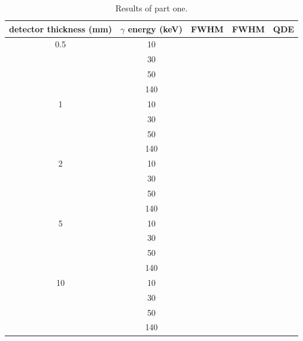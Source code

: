 \documentclass[a4paper]{article}
\begin{document}
\begin{table}
  \centering
  \begin{tabular}{|c|c|c|c|c|}
   \hline
   detector thickness (mm) & $\gamma$ energy (keV) & FWHM & FWHM & QDE \\
   \hline
   0.5 & 10 & & & \\
   \hline
    & 30 & & & \\
    \hline
    & 50 & & & \\
    \hline
    & 140 & & & \\
    \hline
   1 & 10 & & & \\
   \hline
    & 30 & & & \\
    \hline
    & 50 & & & \\
    \hline
    & 140 & & & \\
    \hline
   2 & 10 & & & \\
   \hline
    & 30 & & & \\
    \hline
    & 50 & & & \\
    \hline
    & 140 & & & \\
    \hline
   5 & 10 & & & \\
   \hline
    & 30 & & & \\
    \hline
    & 50 & & & \\
    \hline
    & 140 & & & \\
    \hline
   10 & 10 & & & \\
   \hline
    & 30 & & & \\
    \hline
    & 50 & & & \\
    \hline
    & 140 & & & \\
    \hline
  \end{tabular}
  \caption{Results of part one.}
  \label{tab:part_one}
\end{table}
\end{document}
